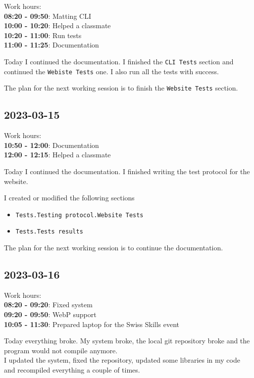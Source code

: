 \documentclass{article}
\begin{document}
Work hours:\\
\textbf{08:20 - 09:50}: Matting CLI \\
\textbf{10:00 - 10:20}: Helped a classmate \\
\textbf{10:20 - 11:00}: Run tests \\
\textbf{11:00 - 11:25}: Documentation

Today I continued the documentation.
I finished the \texttt{CLI Tests} section and continued the
\texttt{Webiste Tests} one.
I also run all the tests with success.

The plan for the next working session is to finish the 
\texttt{Website Tests} section.

\subsection{2023-03-15}

Work hours:\\
\textbf{10:50 - 12:00}: Documentation \\
\textbf{12:00 - 12:15}: Helped a classmate

Today I continued the documentation. I finished writing the test
protocol for the website.

I created or modified the following sections
\begin{itemize}
    \item \texttt{Tests.Testing protocol.Website Tests}
    \item \texttt{Tests.Tests results}
\end{itemize}

The plan for the next working session is to continue the documentation.

\subsection{2023-03-16}

Work hours:\\
\textbf{08:20 - 09:20}: Fixed system \\
\textbf{09:20 - 09:50}: WebP support \\
\textbf{10:05 - 11:30}: Prepared laptop for the Swiss Skills event

Today everything broke. My system broke, the local git repository broke
and the program would not compile anymore. \\
I updated the system, fixed the repository, updated some libraries
in my code and recompiled everything a couple of times.
\end{document}
